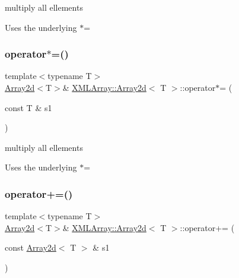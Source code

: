 multiply all ellements 

Uses the underlying $\ast$= \mbox{\label{classXMLArray_1_1Array2d_aee0e6a53c2f9dcc263ba59286d359b38}} 
\subsubsection{\texorpdfstring{operator$\ast$=()}{operator*=()}\hspace{0.1cm}{\footnotesize\ttfamily [4/4]}}
{\footnotesize\ttfamily template$<$typename T$>$ \\
\mbox{\hyperlink{classXMLArray_1_1Array2d}{Array2d}}$<$T$>$\& \mbox{\hyperlink{classXMLArray_1_1Array2d}{X\+M\+L\+Array\+::\+Array2d}}$<$ T $>$\+::operator$\ast$= (\begin{DoxyParamCaption}\item[{const T \&}]{s1 }\end{DoxyParamCaption})\hspace{0.3cm}{\ttfamily [inline]}}



multiply all ellements 

Uses the underlying $\ast$= \mbox{\label{classXMLArray_1_1Array2d_a1e4469713c271b4d9c02ac881cdf00dd}} 
\subsubsection{\texorpdfstring{operator+=()}{operator+=()}\hspace{0.1cm}{\footnotesize\ttfamily [1/2]}}
{\footnotesize\ttfamily template$<$typename T$>$ \\
\mbox{\hyperlink{classXMLArray_1_1Array2d}{Array2d}}$<$T$>$\& \mbox{\hyperlink{classXMLArray_1_1Array2d}{X\+M\+L\+Array\+::\+Array2d}}$<$ T $>$\+::operator+= (\begin{DoxyParamCaption}\item[{const \mbox{\hyperlink{classXMLArray_1_1Array2d}{Array2d}}$<$ T $>$ \&}]{s1 }\end{DoxyParamCaption})\hspace{0.3cm}{\ttfamily [inline]}}



